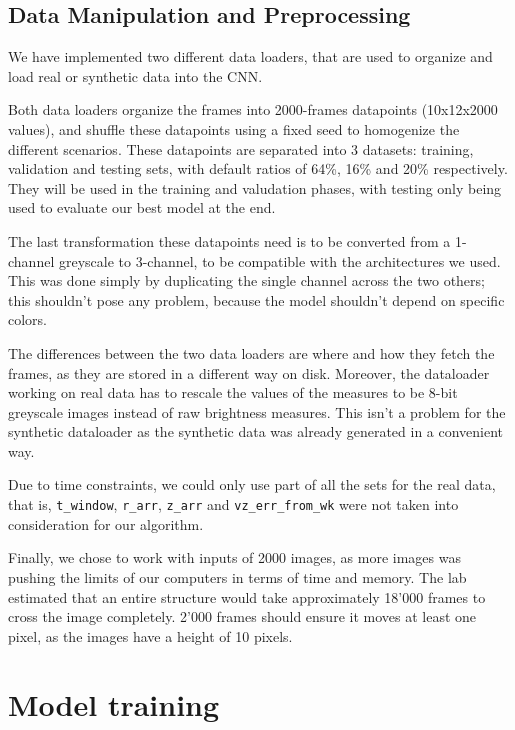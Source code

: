 \documentclass[10pt,conference]{IEEEtran}
\begin{document}
\subsection{Data Manipulation and Preprocessing}
We have implemented two different data loaders, that are used to organize and load real or synthetic data into the CNN.\par
Both data loaders organize the frames into 2000-frames datapoints (10x12x2000 values), and shuffle these datapoints using a fixed seed to homogenize the different scenarios. These datapoints are separated into 3 datasets: training, validation and testing sets, with default ratios of 64\%, 16\% and 20\% respectively. They will be used in the training and valudation phases, with testing only being used to evaluate our best model at the end.\par
The last transformation these datapoints need is to be converted from a 1-channel greyscale to 3-channel, to be compatible with the architectures we used. This was done simply by duplicating the single channel across the two others; this shouldn't pose any problem, because the model shouldn't depend on specific colors.\par
The differences between the two data loaders are where and how they fetch the frames, as they are stored in a different way on disk. Moreover, the dataloader working on real data has to rescale the values of the measures to be 8-bit greyscale images instead of raw brightness measures. This isn't a problem for the synthetic dataloader as the synthetic data was already generated in a convenient way.

Due to time constraints, we could only use part of all the sets for the real data, that is, \texttt{t\_window}, \texttt{r\_arr}, \texttt{z\_arr} and \texttt{vz\_err\_from\_wk} were not taken into consideration for our algorithm.\par
Finally, we chose to work with inputs of 2000 images, as more images was pushing the limits of our computers in terms of time and memory. The lab estimated that an entire structure would take approximately 18'000 frames to cross the image completely. 2'000 frames should ensure it moves at least one pixel, as the images have a height of 10 pixels.\par


\section{Model training}
 
\end{document}

